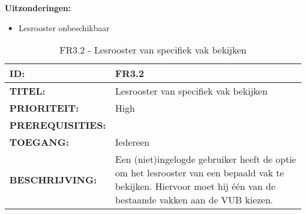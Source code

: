 \textbf{Uitzonderingen:}
\begin{itemize}
\item Lesrooster onbeschikbaar
\end{itemize}


\noindent\begin{table}[H]
            \begin{tabular}{l | p{10cm}}
                \textbf{ID:} & FR3.2 \\ \hline
                \textbf{TITEL:} & Lesrooster van specifiek vak bekijken \\ \hline
                \textbf{PRIORITEIT:} &  High \\ \hline
                \textbf{PREREQUISITIES:} & \\ \hline
                \textbf{TOEGANG:} &  Iedereen \\ \hline
                \textbf{BESCHRIJVING:} & Een (niet)ingelogde gebruiker heeft de optie om het lesrooster van een bepaald vak te bekijken. 
                                        Hiervoor moet hij \'{e}\'{e}n van de bestaande vakken aan de VUB kiezen.\\
            \end{tabular}\\
            \caption{FR3.2 - Lesrooster van specifiek vak bekijken}
            \label{tab:FR3.2 - Lesrooster van specifiek vak bekijken}
        \end{table}

